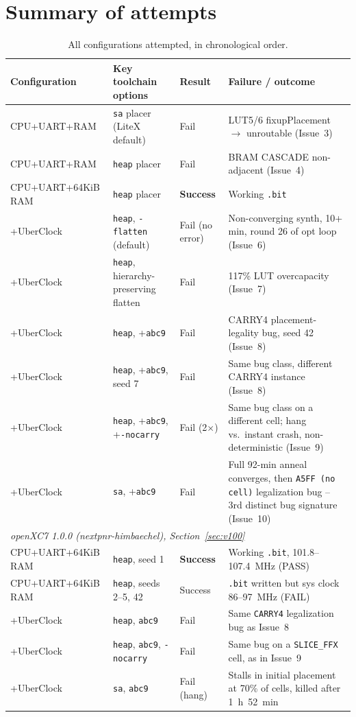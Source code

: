 \documentclass[11pt]{article}
\begin{document}
\section{Summary of attempts}

\begin{table}[H]
\centering
\small
\begin{tabular}{p{}p{}p{}p{}}
\toprule
Configuration & Key toolchain options & Result & Failure / outcome \\
\midrule
CPU+UART+RAM & \lstinline{sa} placer (LiteX default) & Fail & LUT5/6 fixupPlacement $\to$ unroutable (Issue~3) \\
CPU+UART+RAM & \lstinline{heap} placer & Fail & BRAM CASCADE non-adjacent (Issue~4) \\
CPU+UART+64KiB RAM & \lstinline{heap} placer & \textbf{Success} & Working \lstinline{.bit} \\
+UberClock & \lstinline{heap}, \lstinline{-flatten} (default) & Fail (no error) & Non-converging synth, 10+ min, round 26 of opt loop (Issue~6) \\
+UberClock & \lstinline{heap}, hierarchy-preserving flatten & Fail & 117\% LUT overcapacity (Issue~7) \\
+UberClock & \lstinline{heap}, +\lstinline{abc9} & Fail & CARRY4 placement-legality bug, seed 42 (Issue~8) \\
+UberClock & \lstinline{heap}, +\lstinline{abc9}, seed 7 & Fail & Same bug class, different CARRY4 instance (Issue~8) \\
+UberClock & \lstinline{heap}, +\lstinline{abc9}, +\lstinline{-nocarry} & Fail (2$\times$) & Same bug class on a different cell; hang vs.\ instant crash, non-deterministic (Issue~9) \\
+UberClock & \lstinline{sa}, +\lstinline{abc9} & Fail & Full 92-min anneal converges, then \texttt{A5FF (no cell)} legalization bug -- 3rd distinct bug signature (Issue~10) \\
\midrule
\multicolumn{4}{l}{\textit{openXC7 1.0.0 (nextpnr-himbaechel), Section~\ref{sec:v100}}} \\
CPU+UART+64KiB RAM & \lstinline{heap}, seed 1 & \textbf{Success} & Working \lstinline{.bit}, 101.8--107.4~MHz (PASS) \\
CPU+UART+64KiB RAM & \lstinline{heap}, seeds 2--5, 42 & Success & \lstinline{.bit} written but sys clock 86--97~MHz (FAIL) \\
+UberClock & \lstinline{heap}, \lstinline{abc9} & Fail & Same \lstinline{CARRY4} legalization bug as Issue~8 \\
+UberClock & \lstinline{heap}, \lstinline{abc9}, \lstinline{-nocarry} & Fail & Same bug on a \lstinline{SLICE_FFX} cell, as in Issue~9 \\
+UberClock & \lstinline{sa}, \lstinline{abc9} & Fail (hang) & Stalls in initial placement at 70\% of cells, killed after 1~h~52~min \\
\bottomrule
\end{tabular}
\caption{All configurations attempted, in chronological order.}
\end{table}
\end{document}
